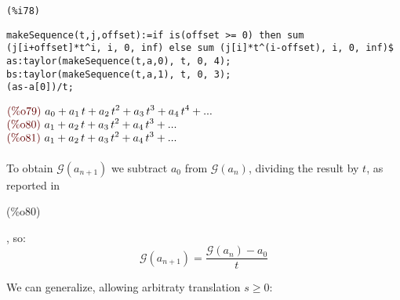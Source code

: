 \noindent
\begin{minipage}[t]{8ex}{\color{red}\bf
\begin{verbatim}
(%i78) 
\end{verbatim}}
\end{minipage}
\begin{minipage}[t]{\textwidth}{\color{blue}
\begin{verbatim}
makeSequence(t,j,offset):=if is(offset >= 0) then sum
(j[i+offset]*t^i, i, 0, inf) else sum (j[i]*t^(i-offset), i, 0, inf)$
as:taylor(makeSequence(t,a,0), t, 0, 4);
bs:taylor(makeSequence(t,a,1), t, 0, 3);
(as-a[0])/t;
\end{verbatim}}
\end{minipage}
\begin{math}\displaystyle
\parbox{8ex}{\color{labelcolor}(\%o79) }
{a}_{0}+{a}_{1}\,t+{a}_{2}\,{t}^{2}+{a}_{3}\,{t}^{3}+{a}_{4}\,{t}^{4}+...
\end{math}\\
\begin{math}\displaystyle
\parbox{8ex}{\color{labelcolor}(\%o80) }
{a}_{1}+{a}_{2}\,t+{a}_{3}\,{t}^{2}+{a}_{4}\,{t}^{3}+...
\end{math}\\
\begin{math}\displaystyle
\parbox{8ex}{\color{labelcolor}(\%o81) }
{a}_{1}+{a}_{2}\,t+{a}_{3}\,{t}^{2}+{a}_{4}\,{t}^{3}+...
\end{math}
\\\\
To obtain $\mathcal{G}(a_{n+1})$ we subtract $a_0$ from $\mathcal{G}
(a_n)$, dividing the result by $t$, as reported
in \parbox{8ex}{\color{labelcolor}(\%o80) }, so:
\begin{equation*}
\mathcal{G}(a_{n+1})
= \frac{\mathcal{G} (a_n) - a_0}{t}
\end{equation*}

We can generalize, allowing arbitraty translation $s \geq 0$:

